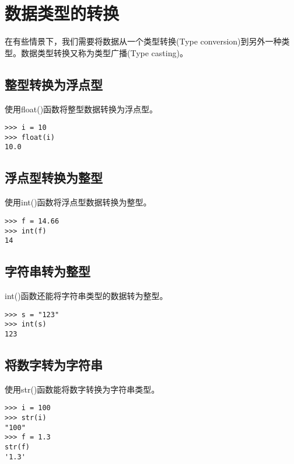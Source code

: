 \section{数据类型的转换}
在有些情景下，我们需要将数据从一个类型转换(Type conversion)到另外一种类型。数据类型转换又称为类型广播(Type casting)。

\subsection{整型转换为浮点型}
使用float()函数将整型数据转换为浮点型。

\begin{lstlisting}
>>> i = 10
>>> float(i)
10.0
\end{lstlisting}

\subsection{浮点型转换为整型}
使用int()函数将浮点型数据转换为整型。

\begin{lstlisting}
>>> f = 14.66
>>> int(f)
14
\end{lstlisting}

\subsection{字符串转为整型}
int()函数还能将字符串类型的数据转为整型。

\begin{lstlisting}
>>> s = "123"
>>> int(s)
123
\end{lstlisting}

\subsection{将数字转为字符串}
使用str()函数能将数字转换为字符串类型。

\begin{lstlisting}
>>> i = 100
>>> str(i)
"100"
>>> f = 1.3
str(f)
'1.3'
\end{lstlisting}

